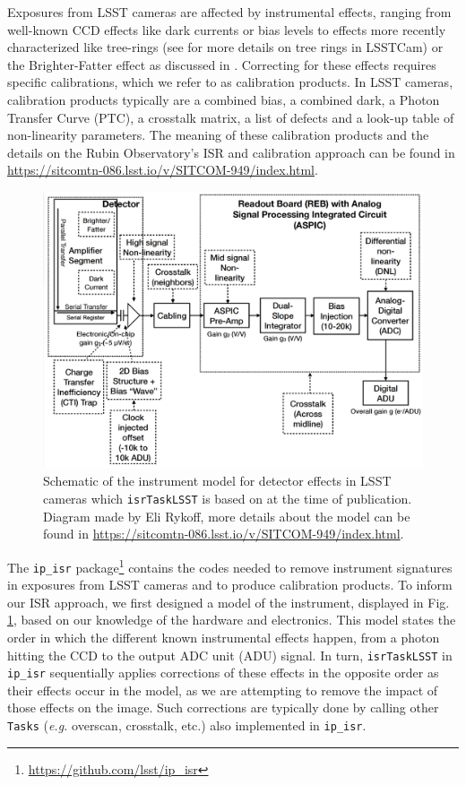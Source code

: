 Exposures from LSST cameras are affected by instrumental effects, ranging from well-known CCD effects like dark currents or bias levels to effects more recently characterized like tree-rings (see \cite{park_properties_2017,park_tree_2020,esteves_photometry_2023} for more details on tree rings in LSSTCam) or the Brighter-Fatter effect as discussed in \cite{broughton_2023}. Correcting for these effects requires specific calibrations, which we refer to as calibration products. In LSST cameras, calibration products typically are a combined bias, a combined dark, a Photon Transfer Curve (PTC), a crosstalk matrix, a list of defects and a look-up table of non-linearity parameters.
The meaning of these calibration products and the details on the Rubin Observatory's ISR and calibration approach can be found in \url{https://sitcomtn-086.lsst.io/v/SITCOM-949/index.html}.
\begin{figure}[h!]
    \centering
\includegraphics[scale=0.25]{isr_plots/instrumentmodel_isr.png}
    \caption{Schematic of the instrument model for detector effects in LSST cameras which \texttt{isrTaskLSST} is based on at the time of publication. Diagram made by Eli Rykoff, more details about the model can be found in \url{https://sitcomtn-086.lsst.io/v/SITCOM-949/index.html}.}
    \label{fig:isr_model}
\end{figure}

The \texttt{ip\_isr} package\footnote{\url{https://github.com/lsst/ip_isr}} contains the codes needed to remove instrument signatures in exposures from LSST cameras and to produce calibration products.
To inform our ISR approach, we first designed a model of the instrument, displayed in Fig. \ref{fig:isr_model}, based on our knowledge of the hardware and electronics.
This model states the order in which the different known instrumental effects happen, from a photon hitting the CCD to the output ADC unit (ADU) signal.
In turn, \texttt{isrTaskLSST} in \texttt{ip\_isr} sequentially applies corrections of these effects in the opposite order as their effects occur in the model, as we are attempting to remove the impact of those effects on the image. Such corrections are typically done by calling other \texttt{Tasks} (\textit{e.g.} overscan, crosstalk, etc.) also implemented in \texttt{ip\_isr}.


